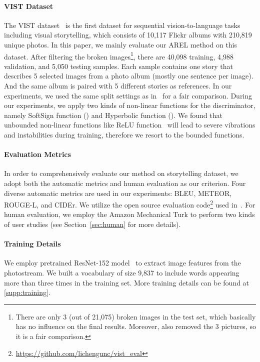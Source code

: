 \documentclass[11pt,a4paper]{article}
\begin{document}
\paragraph{VIST Dataset} The VIST dataset~\cite{huang2016visual} is the first dataset for sequential vision-to-language tasks including visual storytelling, which consists of 10,117 Flickr albums with 210,819 unique photos. In this paper, we mainly evaluate our AREL method on this dataset. After filtering the broken images\footnote{There are only 3 (out of 21,075) broken images in the test set, which basically has no influence on the final results. Moreover, \citet{yu-bansal-berg:2017:EMNLP2017} also removed the 3 pictures, so it is a fair comparison.}, there are 40,098 training, 4,988 validation, and 5,050 testing samples. 
Each sample contains one story that describes 5 selected images from a photo album (mostly one sentence per image). And the same album is paired with 5 different stories as references. In our experiments, we used the same split settings as in~\cite{huang2016visual,yu-bansal-berg:2017:EMNLP2017} for a fair comparison. During our experiments, we apply two kinds of non-linear functions  for the discriminator, namely SoftSign function () and Hyperbolic function  (). We found that unbounded non-linear functions like ReLU function~\cite{glorot2011deep} will lead to severe vibrations and instabilities during training, therefore we resort to the bounded functions.

\paragraph{Evaluation Metrics}
In order to comprehensively evaluate our method on storytelling dataset, we adopt both the automatic metrics and human evaluation as our criterion. Four diverse automatic metrics are used in our experiments: BLEU, METEOR, ROUGE-L, and CIDEr. We utilize the open source evaluation code\footnote{\scriptsize\url{https://github.com/lichengunc/vist_eval}} used in~\cite{yu-bansal-berg:2017:EMNLP2017}. For human evaluation, we employ the Amazon Mechanical Turk to perform two kinds of user studies (see Section~\ref{sec:human} for more details). 

\paragraph{Training Details}
We employ pretrained ResNet-152 model~\cite{he2016deep} to extract image features from the photostream. We built a vocabulary of size 9,837 to include words appearing more than three times in the training set. More training details can be found at \autoref{supp:training}. 
\end{document}
